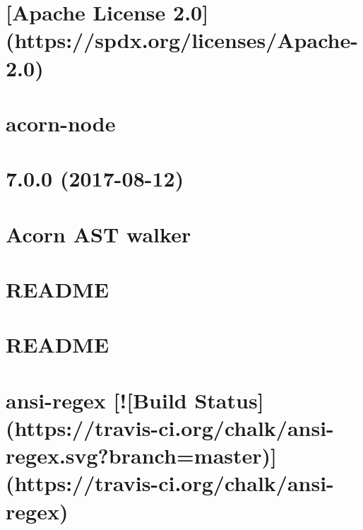 \documentclass[twoside]{book}
\newcommand{\+}{\discretionary{\mbox{\scriptsize$\hookleftarrow$}}{}{}}
\begin{document}
\chapter{\mbox{[}Apache License 2.0\mbox{]}(https\+://spdx.org/licenses/\+Apache-\/2.0)}
\label{md_dsmacc_examples_DRmerge_node_modules_acorn-node_LICENSE}

\chapter{acorn-\/node}
\label{md_dsmacc_examples_DRmerge_node_modules_acorn-node_README}

\chapter{7.0.0 (2017-\/08-\/12)}
\label{md_dsmacc_examples_DRmerge_node_modules_acorn-walk_CHANGELOG}

\chapter{Acorn A\+ST walker}
\label{md_dsmacc_examples_DRmerge_node_modules_acorn-walk_README}

\chapter{R\+E\+A\+D\+ME}
\label{md_dsmacc_examples_DRmerge_node_modules_ajv_lib_dotjs_README}

\chapter{R\+E\+A\+D\+ME}
\label{md_dsmacc_examples_DRmerge_node_modules_ajv_README}

\chapter{ansi-\/regex \mbox{[}!\mbox{[}Build Status\mbox{]}(https\+://travis-\/ci.org/chalk/ansi-\/regex.svg?branch=master)\mbox{]}(https\+://travis-\/ci.org/chalk/ansi-\/regex)}
\label{md_dsmacc_examples_DRmerge_node_modules_ansi-regex_readme}

\end{document}
